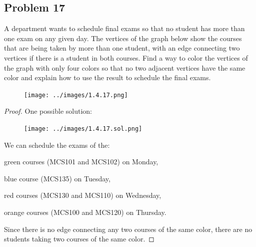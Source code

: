 \documentclass[14pt]{extarticle}
\begin{document}
\subsection{Problem 17}
A department wants to schedule final exams so that no student has more than one
exam on any given day. The vertices of the graph below show the courses that are
being taken by more than one student, with an edge connecting two vertices if
there is a student in both courses. Find a way to color the vertices of the
graph with only four colors so that no two adjacent vertices have the same color
and explain how to use the result to schedule the final exams.

\begin{figure}[ht!]
    \centering
    \texttt{[image: ../images/1.4.17.png]}
\end{figure}

\begin{proof}
    One possible solution:
    \begin{figure}[ht!]
        \centering
        \texttt{[image: ../images/1.4.17.sol.png]}
    \end{figure}

    We can schedule the exams of the:

    green courses (MCS101 and MCS102) on Monday,

    blue course (MCS135) on Tuesday,

    red courses (MCS130 and MCS110) on Wednesday,

    orange courses (MCS100 and MCS120) on Thursday.

    Since there is no edge connecting any two courses of the same color, there are
    no students taking two courses of the same color.
\end{proof}
\end{document}
